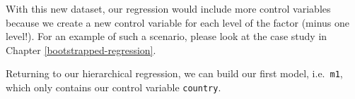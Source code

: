 \documentclass[
]{book}
\newenvironment{Shaded}{\begin{snugshade}}{\end{snugshade}}
\newcommand{\DocumentationTok}[1]{\textcolor[rgb]{0.56,0.35,0.01}{\textbf{\textit{#1}}}}
\newcommand{\FunctionTok}[1]{\textcolor[rgb]{0.00,0.00,0.00}{#1}}
\newcommand{\NormalTok}[1]{#1}
\newcommand{\OtherTok}[1]{\textcolor[rgb]{0.56,0.35,0.01}{#1}}
\newcommand{\SpecialCharTok}[1]{\textcolor[rgb]{0.00,0.00,0.00}{#1}}
\newcommand{\StringTok}[1]{\textcolor[rgb]{0.31,0.60,0.02}{#1}}
\begin{document}
\begin{Shaded}
\end{Shaded}

With this new dataset, our regression would include more control variables because we create a new control variable for each level of the factor (minus one level!). For an example of such a scenario, please look at the case study in Chapter \ref{bootstrapped-regression}.

Returning to our hierarchical regression, we can build our first model, i.e.~\texttt{m1}, which only contains our control variable \texttt{country}.
\end{document}
